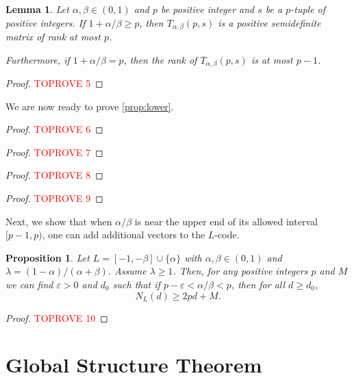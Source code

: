 \documentclass[reqno, 11pt]{amsart}
\newtheorem{proposition}[theorem]{Proposition}
\newtheorem{lemma}[theorem]{Lemma}
\theoremstyle{definition}
\theoremstyle{remark}
\begin{document}
\begin{lemma}\label{lem:psd-template}
    Let $\alpha, \beta \in (0,1)$ and $p$ be positive integer and $s$ be a $p$-tuple of positive integers. If $1 + \alpha/\beta \geq p$, then $T_{\alpha,\beta}(p,s)$ is a positive semidefinite matrix of rank at most $p$. 
    
    Furthermore, if $1 + \alpha/\beta = p$, then the rank of $T_{\alpha,\beta}(p,s)$ is at most $p-1$.
\end{lemma}

\begin{proof}\textcolor{red}{TOPROVE 5}\end{proof}

We are now ready to prove \cref{prop:lower}.

\begin{proof}\textcolor{red}{TOPROVE 6}\end{proof}
\medskip

\begin{proof}\textcolor{red}{TOPROVE 7}\end{proof}

\begin{proof}\textcolor{red}{TOPROVE 8}\end{proof}
\medskip

\begin{proof}\textcolor{red}{TOPROVE 9}\end{proof}

Next, we show that when $\alpha/\beta$ is near the upper end of its allowed interval $[p-1,p)$, one can add additional vectors to the $L$-code.

\begin{proposition}\label{prop:lower-extra}
     Let $L = [-1,-\beta]\cup \{\alpha\}$ with $\alpha, \beta \in (0,1)$ and $\lambda = (1-\alpha)/(\alpha + \beta)$. Assume $\lambda \ge 1$.
     Then, for any positive integers $p$ and $M$ we can find $\varepsilon > 0$ and $d_0$ such that if $p-\varepsilon < \alpha/\beta < p$, then for all $d \geq d_0$,
    \[
         N_L(d) \geq 2pd + M.
    \]
\end{proposition}

\begin{proof}\textcolor{red}{TOPROVE 10}\end{proof}

\section{Global Structure Theorem}\label{sec:global}
\end{document}

